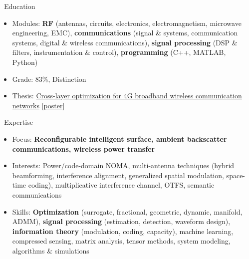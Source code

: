 \documentclass{cv}
\begin{document}
\begin{section}{\faUniversity\ Education}
	\begin{itemize}[rightmargin=60pt]
		\item Modules: \textbf{RF} (antennas, circuits, electronics, electromagnetism, microwave engineering, EMC), \textbf{communications} (signal \& systems, communication systems, digital \& wireless communications), \textbf{signal processing} (DSP \& filters, instrumentation \& control), \textbf{programming} (C++, MATLAB, Python)
		\item Grade: 83\%, Distinction
		\item Thesis: \href{https://cloud.snowztail.com/s/7dyLXmkxKwfdWNx}{Cross-layer optimization for 4G broadband wireless communication networks} [\href{https://cloud.snowztail.com/s/3g7cDQ6x4DfLB6G}{poster}]
	\end{itemize}
\end{section}

\vspace{-1em}

\begin{section}{\faThumbsUp\ Expertise}
	\begin{itemize}
		\item Focus: \textbf{Reconfigurable intelligent surface, ambient backscatter communications, wireless power transfer}
		\item Interests: Power/code-domain NOMA, multi-antenna techniques (hybrid beamforming, interference alignment, generalized spatial modulation, space-time coding), multiplicative interference channel, OTFS, semantic communications
		\item Skills: \textbf{Optimization} (surrogate, fractional, geometric, dynamic, manifold, ADMM), \textbf{signal processing} (estimation, detection, waveform design), \textbf{information theory} (modulation, coding, capacity), machine learning, compressed sensing, matrix analysis, tensor methods, system modeling, algorithms \& simulations
	\end{itemize}
\end{section}

\vspace{-1em}
\end{document}
